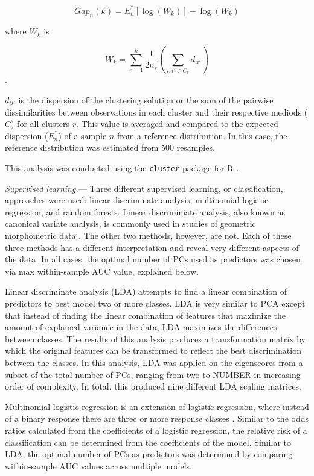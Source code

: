 \documentclass[12pt,letterpaper]{article}
\renewcommand{\subsubsection}[1]{%
\vspace{2ex}
\noindent
\textit{#1.}---}
\begin{document}
\[Gap_{n}(k) = E^{*}_{n}[\log(W_{k})] - \log(W_{k})\] 

where \(W_{k}\) is

\[W_{k} = \sum^{k}_{r = 1}{\frac{1}{2n_{r}} (\sum_{i,i' \in C_{r}} d_{ii'})}\].

\(d_{ii'}\) is the dispersion of the clustering solution or the sum of the pairwise dissimilarities between observations in each cluster and their respective mediods (\(C\)) for all clusters \(r\). This value is averaged and compared to the expected dispersion (\(E^{*}_{n}\)) of a sample \(n\) from a reference distribution. In this case, the reference distribution was estimated from 500 resamples.

This analysis was conducted using the \texttt{cluster} package for R \citep{Maechler2013}.

\subsubsection{Supervised learning}
Three different supervised learning, or classification, approaches were used: linear discriminate analysis, multinomial logistic regression, and random forests. Linear discriminiate analysis, also known as canonical variate analysis, is commonly used in studies of geometric morphometric data \citep{Zelditch2004,Mitteroecker2011}. The other two methods, however, are not. Each of these three methods has a different interpretation and reveal very different aspects of the data. In all cases, the optimal number of PCs used as predictors was chosen via max within-sample AUC value, explained below.

Linear discriminate analysis (LDA) attempts to find a linear combination of predictors to best model two or more classes. LDA is very similar to PCA except that instead of finding the linear combination of features that maximize the amount of explained variance in the data, LDA maximizes the differences between classes. The results of this analysis produces a transformation matrix by which the original features can be transformed to reflect the best discrimination between the classes. In this analysis, LDA was applied on the eigenscores from a subset of the total number of PCs, ranging from two to NUMBER in increasing order of complexity. In total, this produced nine different LDA scaling matrices. 

Multinomial logistic regression is an extension of logistic regression, where instead of a binary response there are three or more response classes \citep{Venables2002a}. Similar to the odds ratios calculated from the coefficients of a logistic regression, the relative risk of a classification can be determined from the coefficients of the model. Similar to LDA, the optimal number of PCs as predictors was determined by comparing within-sample AUC values across multiple models.  %
\end{document}
